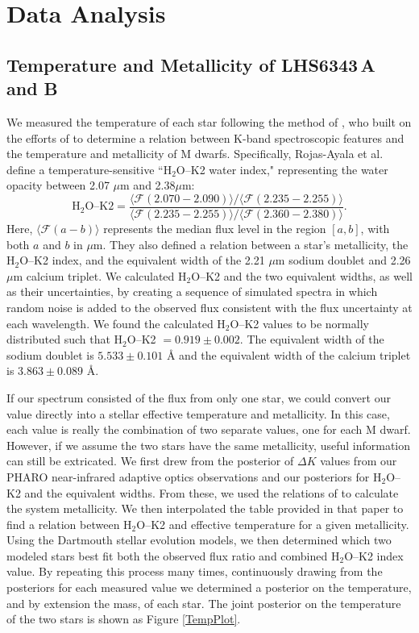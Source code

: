 \section{Data Analysis}

\subsection{Temperature and Metallicity of LHS6343\,A and B}
\label{TripleSpec}
We measured the temperature of each star following the method of \citet{RojasAyala12}, who built on the efforts of \citet{Covey10} to determine a relation between K-band spectroscopic features and the temperature and metallicity of M dwarfs. 
Specifically, Rojas-Ayala et al. define a temperature-sensitive ``H$_2$O--K2 water index," representing the water opacity between 2.07 $\mu$m and 2.38$\mu$m:
\begin{equation}
\textrm{H}_2\textrm{O--K}2 = \frac{\langle\mathcal{F}(2.070-2.090)\rangle /\langle\mathcal{F}(2.235-2.255)\rangle}{\langle\mathcal{F}(2.235-2.255)\rangle /\langle\mathcal{F}(2.360-2.380)\rangle}.
\end{equation}
Here, $\langle \mathcal{F}(a-b)\rangle$ represents the median flux level in the region $[a, b]$, with both $a$ and $b$ in $\mu$m.
They also defined a relation between a star's metallicity, the H$_2$O--K2 index, and the equivalent width of the 2.21 $\mu$m sodium doublet and 2.26 $\mu$m calcium triplet. 
We calculated H$_2$O--K2 and the two equivalent widths, as well as their uncertainties, by creating a sequence of simulated spectra in which random noise is added to the observed flux consistent with the flux uncertainty at each wavelength.
We found the calculated H$_2$O--K2 values to be normally distributed such that H$_2$O--K2 $ = 0.919 \pm 0.002$. 
The equivalent width of the sodium doublet is $5.533 \pm 0.101$ \AA{} and the equivalent width of the calcium triplet is $3.863 \pm 0.089$ \AA.

If our spectrum consisted of the flux from only one star, we could convert our value directly into a stellar effective temperature and metallicity. 
In this case, each value is really the combination of two separate values, one for each M dwarf. 
However, if we assume the two stars have the same metallicity, useful information can still be extricated.
We first drew from the posterior of $\Delta K$ values from our PHARO near-infrared adaptive optics observations and our posteriors for H$_2$O--K2 and the equivalent widths. 
From these, we used the relations of \citet{RojasAyala12} to calculate the system metallicity. 
We then interpolated the table provided in that paper to find a relation between H$_2$O--K2 and effective temperature for a given metallicity. 
Using the Dartmouth stellar evolution models, we then determined which two modeled stars best fit both the observed flux ratio and combined H$_2$O--K2 index value. 
By repeating this process many times, continuously drawing from the posteriors for each measured value we determined a posterior on the temperature, and by extension the mass, of each star. 
The joint posterior on the temperature of the two stars is shown as Figure \ref{TempPlot}.

